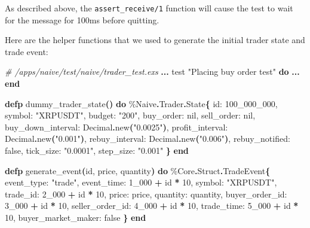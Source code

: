 \documentclass[
  oneside]{book}
\newenvironment{Shaded}{\begin{snugshade}}{\end{snugshade}}
\newcommand{\CommentTok}[1]{\textcolor[rgb]{0.56,0.35,0.01}{\textit{#1}}}
\newcommand{\ConstantTok}[1]{\textcolor[rgb]{0.56,0.35,0.01}{#1}}
\newcommand{\DecValTok}[1]{\textcolor[rgb]{0.00,0.00,0.81}{#1}}
\newcommand{\FunctionTok}[1]{\textcolor[rgb]{0.13,0.29,0.53}{\textbf{#1}}}
\newcommand{\KeywordTok}[1]{\textcolor[rgb]{0.13,0.29,0.53}{\textbf{#1}}}
\newcommand{\NormalTok}[1]{#1}
\newcommand{\OperatorTok}[1]{\textcolor[rgb]{0.81,0.36,0.00}{\textbf{#1}}}
\newcommand{\StringTok}[1]{\textcolor[rgb]{0.31,0.60,0.02}{#1}}
\newcommand{\VariableTok}[1]{\textcolor[rgb]{0.00,0.00,0.00}{#1}}
\begin{document}
As described above, the \texttt{assert\_receive/1} function will cause the test to wait for the message for 100ms before quitting.

Here are the helper functions that we used to generate the initial trader state and trade event:

\begin{Shaded}
\begin{Highlighting}[]
\CommentTok{\# /apps/naive/test/naive/trader\_test.exs}
  \OperatorTok{...}
\NormalTok{  test }\StringTok{"Placing buy order test"} \KeywordTok{do}
    \OperatorTok{...}
  \KeywordTok{end}

  \KeywordTok{defp}\NormalTok{ dummy\_trader\_state}\FunctionTok{()} \KeywordTok{do}
\NormalTok{    \%}\ConstantTok{Naive}\OperatorTok{.}\ConstantTok{Trader}\OperatorTok{.}\ConstantTok{State}\FunctionTok{\{}
      \VariableTok{id:} \DecValTok{100\_000\_000}\NormalTok{,}
      \VariableTok{symbol:} \StringTok{"XRPUSDT"}\NormalTok{,}
      \VariableTok{budget:} \StringTok{"200"}\NormalTok{,}
      \VariableTok{buy\_order:} \ConstantTok{nil}\NormalTok{,}
      \VariableTok{sell\_order:} \ConstantTok{nil}\NormalTok{,}
      \VariableTok{buy\_down\_interval:} \ConstantTok{Decimal}\OperatorTok{.}\NormalTok{new}\FunctionTok{(}\StringTok{"0.0025"}\FunctionTok{)}\NormalTok{,}
      \VariableTok{profit\_interval:} \ConstantTok{Decimal}\OperatorTok{.}\NormalTok{new}\FunctionTok{(}\StringTok{"0.001"}\FunctionTok{)}\NormalTok{,}
      \VariableTok{rebuy\_interval:} \ConstantTok{Decimal}\OperatorTok{.}\NormalTok{new}\FunctionTok{(}\StringTok{"0.006"}\FunctionTok{)}\NormalTok{,}
      \VariableTok{rebuy\_notified:} \ConstantTok{false}\NormalTok{,}
      \VariableTok{tick\_size:} \StringTok{"0.0001"}\NormalTok{,}
      \VariableTok{step\_size:} \StringTok{"0.001"}
    \FunctionTok{\}}
  \KeywordTok{end}

  \KeywordTok{defp}\NormalTok{ generate\_event}\FunctionTok{(}\NormalTok{id, price, quantity}\FunctionTok{)} \KeywordTok{do}
\NormalTok{    \%}\ConstantTok{Core}\OperatorTok{.}\ConstantTok{Struct}\OperatorTok{.}\ConstantTok{TradeEvent}\FunctionTok{\{}
      \VariableTok{event\_type:} \StringTok{"trade"}\NormalTok{,}
      \VariableTok{event\_time:} \DecValTok{1\_000} \OperatorTok{+}\NormalTok{ id }\OperatorTok{*} \DecValTok{10}\NormalTok{,}
      \VariableTok{symbol:} \StringTok{"XRPUSDT"}\NormalTok{,}
      \VariableTok{trade\_id:} \DecValTok{2\_000} \OperatorTok{+}\NormalTok{ id }\OperatorTok{*} \DecValTok{10}\NormalTok{,}
      \VariableTok{price:}\NormalTok{ price,}
      \VariableTok{quantity:}\NormalTok{ quantity,}
      \VariableTok{buyer\_order\_id:} \DecValTok{3\_000} \OperatorTok{+}\NormalTok{ id }\OperatorTok{*} \DecValTok{10}\NormalTok{,}
      \VariableTok{seller\_order\_id:} \DecValTok{4\_000} \OperatorTok{+}\NormalTok{ id }\OperatorTok{*} \DecValTok{10}\NormalTok{,}
      \VariableTok{trade\_time:} \DecValTok{5\_000} \OperatorTok{+}\NormalTok{ id }\OperatorTok{*} \DecValTok{10}\NormalTok{,}
      \VariableTok{buyer\_market\_maker:} \ConstantTok{false}
    \FunctionTok{\}}
  \KeywordTok{end}
\end{Highlighting}
\end{Shaded}
\end{document}
